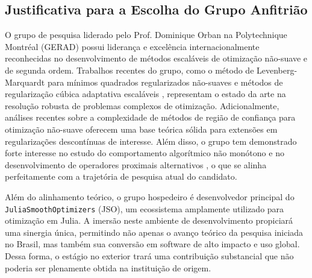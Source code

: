 \subsection{Justificativa para a Escolha do Grupo Anfitrião}
O grupo de pesquisa liderado pelo Prof. Dominique Orban na Polytechnique Montréal (GERAD) possui liderança e excelência internacionalmente reconhecidas no desenvolvimento de métodos escaláveis de otimização não-suave e de segunda ordem. Trabalhos recentes do grupo, como o método de Levenberg-Marquardt para mínimos quadrados regularizados não-suaves \cite{aravkin2024levenberg} e métodos de regularização cúbica adaptativa escaláveis \cite{dussault2024scalable}, representam o estado da arte na resolução robusta de problemas complexos de otimização. Adicionalmente, análises recentes sobre a complexidade de métodos de região de confiança para otimização não-suave \cite{leconte2023complexity} oferecem uma base teórica sólida para extensões em regularizações descontínuas de interesse. Além disso, o grupo tem demonstrado forte interesse no estudo do comportamento algorítmico não monótono e no desenvolvimento de operadores proximais alternativos \cite{Leconte_2024}, o que se alinha perfeitamente com a trajetória de pesquisa atual do candidato.

Além do alinhamento teórico, o grupo hospedeiro é desenvolvedor principal do \texttt{JuliaSmoothOptimizers} (JSO), um ecossistema amplamente utilizado para otimização em Julia. A imersão neste ambiente de desenvolvimento propiciará uma sinergia única, permitindo não apenas o avanço teórico da pesquisa iniciada no Brasil, mas também sua conversão em software de alto impacto e uso global. Dessa forma, o estágio no exterior trará uma contribuição substancial que não poderia ser plenamente obtida na instituição de origem.
